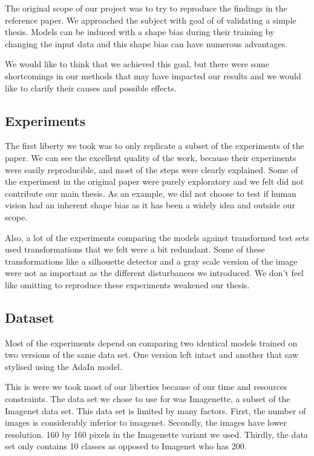 \documentclass{article}
\begin{document}
The original scope of our project was to try to reproduce the findings in the reference paper.
We approached the subject with goal of of validating a simple thesis. 
Models can be induced with a shape bias during their training by changing the input data and 
this shape bias can have numerous advantages.\medskip \par

\noindent
We would like to think that we achieved this goal, but there were some shortcomings in our methods that may have impacted our results and we would like to clarify their causes and possible effects.

\subsection{Experiments}

The first liberty we took was to only replicate a subset of the experiments of the paper.
We can see the excellent quality of the work, 
because their experiments were easily reproducible, and most of the 
steps were clearly explained.
Some of the experiment in the original paper were purely exploratory and 
we felt did not contribute our main thesis. 
As an example, we did not choose to test if human vision had an inherent shape bias as 
it has been a widely idea and outside our scope. \medskip \par

\noindent
Also, a lot of the experiments comparing the models against transformed test sets used transformations that we felt were a bit redundant. Some of these transformations like a silhouette detector and a gray scale version of the image were not as important as the different disturbances we introduced.
We don't feel like omitting to reproduce these experiments weakened our thesis.

\subsection{Dataset}

Most of the experiments depend on comparing two identical models trained on two versions of the same data set. One version left intact and another that saw stylised using the AdaIn model.

This is were we took most of our liberties because of our time and resources constraints.
The data set we chose to use for was Imagenette, a subset of the Imagenet data set.
This data set is limited by many factors. First, the number of images is considerably inferior to imagenet. Secondly, the images have lower resolution. 160 by 160 pixels in the Imagenette variant we used. Thirdly, the data set only contains 10 classes as opposed to Imagenet who has 200.
\end{document}
